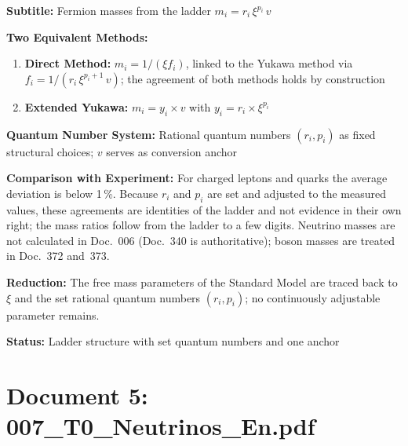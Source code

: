 	\begin{documentbox}
		\textbf{Subtitle:} Fermion masses from the ladder $m_i = r_i\,\xi^{p_i}\,v$
		
		\textbf{Two Equivalent Methods:}
		\begin{enumerate}
			\item \textbf{Direct Method:} $m_i = 1/(\xi f_i)$, linked to the Yukawa method via $f_i = 1/(r_i\,\xi^{p_i+1}\,v)$; the agreement of both methods holds by construction
			\item \textbf{Extended Yukawa:} $m_i = y_i \times v$ with $y_i = r_i \times \xi^{p_i}$
		\end{enumerate}
		
		\textbf{Quantum Number System:} Rational quantum numbers $(r_i, p_i)$ as fixed structural choices; $v$ serves as conversion anchor
		
		\textbf{Comparison with Experiment:} For charged leptons and quarks the average deviation is below 1\,\%. Because $r_i$ and $p_i$ are set and adjusted to the measured values, these agreements are identities of the ladder and not evidence in their own right; the mass ratios follow from the ladder to a few digits. Neutrino masses are not calculated in Doc.~006 (Doc.~340 is authoritative); boson masses are treated in Doc.~372 and~373.
		
		\textbf{Reduction:} The free mass parameters of the Standard Model are traced back to $\xi$ and the set rational quantum numbers $(r_i, p_i)$; no continuously adjustable parameter remains.
		
		\textbf{Status:} Ladder structure with set quantum numbers and one anchor
	\end{documentbox}
	
	\section{Document 5: 007\_T0\_Neutrinos\_En.pdf}
	
